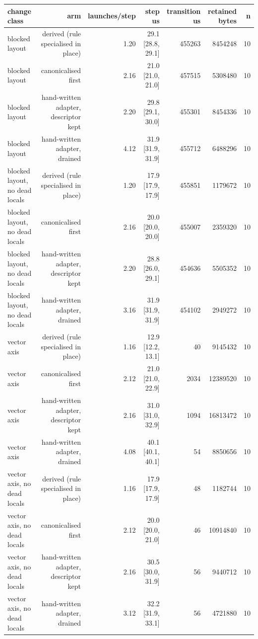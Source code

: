 \begin{tabular}{lrrrrrr}
\toprule
change class & arm & launches/step & step us & transition us & retained bytes & n \\
\midrule
blocked layout & derived (rule specialised in place) & 1.20 & 29.1 [28.8, 29.1] & 455263 & 8454248 & 10 \\
blocked layout & canonicalised first & 2.16 & 21.0 [21.0, 21.0] & 457515 & 5308480 & 10 \\
blocked layout & hand-written adapter, descriptor kept & 2.20 & 29.8 [29.1, 30.0] & 455301 & 8454336 & 10 \\
blocked layout & hand-written adapter, drained & 4.12 & 31.9 [31.9, 31.9] & 455712 & 6488296 & 10 \\
blocked layout, no dead locals & derived (rule specialised in place) & 1.20 & 17.9 [17.9, 17.9] & 455851 & 1179672 & 10 \\
blocked layout, no dead locals & canonicalised first & 2.16 & 20.0 [20.0, 20.0] & 455007 & 2359320 & 10 \\
blocked layout, no dead locals & hand-written adapter, descriptor kept & 2.20 & 28.8 [26.0, 29.1] & 454636 & 5505352 & 10 \\
blocked layout, no dead locals & hand-written adapter, drained & 3.16 & 31.9 [31.9, 31.9] & 454102 & 2949272 & 10 \\
vector axis & derived (rule specialised in place) & 1.16 & 12.9 [12.2, 13.1] & 40 & 9145432 & 10 \\
vector axis & canonicalised first & 2.12 & 21.0 [21.0, 22.9] & 2034 & 12389520 & 10 \\
vector axis & hand-written adapter, descriptor kept & 2.16 & 31.0 [31.0, 32.9] & 1094 & 16813472 & 10 \\
vector axis & hand-written adapter, drained & 4.08 & 40.1 [40.1, 40.1] & 54 & 8850656 & 10 \\
vector axis, no dead locals & derived (rule specialised in place) & 1.16 & 17.9 [17.9, 17.9] & 48 & 1182744 & 10 \\
vector axis, no dead locals & canonicalised first & 2.12 & 20.0 [20.0, 21.0] & 46 & 10914840 & 10 \\
vector axis, no dead locals & hand-written adapter, descriptor kept & 2.16 & 30.5 [30.0, 31.9] & 56 & 9440712 & 10 \\
vector axis, no dead locals & hand-written adapter, drained & 3.12 & 32.2 [31.9, 33.1] & 56 & 4721880 & 10 \\
\bottomrule
\end{tabular}
